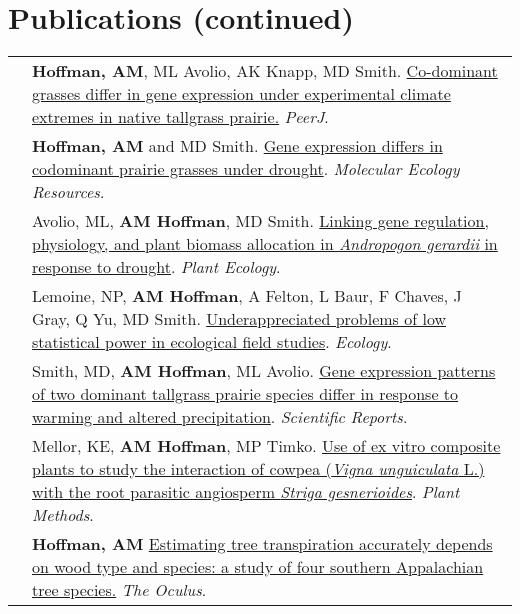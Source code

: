 \documentclass[letterpaper]{deedy-resume} %
\begin{document}
\section{Publications (continued)}
\begin{tabular}{>{\raggedleft\arraybackslash}p{2cm}p{16cm}}

2018 & \textbf{Hoffman, AM}, ML Avolio, AK Knapp, MD Smith. \href{https://peerj.com/articles/4394.pdf}{Co-dominant grasses differ in gene expression under experimental climate extremes in native tallgrass prairie.} \textcolor{special}{\textit{PeerJ}}.\\

2017 & \textbf{Hoffman, AM} and MD Smith. \href{http://onlinelibrary.wiley.com/doi/10.1111/1755-0998.12733/full}{Gene expression differs in codominant prairie grasses under drought}. \textcolor{special}{\textit{Molecular Ecology Resources}}.\\

2017 & Avolio, ML, \textbf{AM Hoffman}, MD Smith. \href{https://link.springer.com/article/10.1007/s11258-017-0773-3}{Linking gene regulation, physiology, and plant biomass allocation in \textit{Andropogon gerardii} in response to drought}. \textcolor{special}{\textit{Plant Ecology}}. \\

2016 & Lemoine, NP, \textbf{AM Hoffman}, A Felton, L Baur, F Chaves, J Gray, Q Yu, MD Smith. \href{http://onlinelibrary.wiley.com/doi/10.1002/ecy.1506/full}{Underappreciated problems of low statistical power in ecological field studies}. \textcolor{special}{\textit{Ecology}}. \\

2016 & Smith, MD, \textbf{AM Hoffman}, ML Avolio. \href{http://www.nature.com/articles/srep25522}{Gene expression patterns of two dominant tallgrass prairie species differ in response to warming and altered precipitation}. \textcolor{special}{\textit{Scientific Reports}}.\\

2012 & Mellor, KE, \textbf{AM Hoffman}, MP Timko. \href{http://www.plantmethods.com/content/pdf/1746-4811-8-22.pdf}{Use of ex vitro composite plants to study the interaction of cowpea (\textit{Vigna unguiculata} L.) with the root parasitic angiosperm \textit{Striga gesnerioides}}. \textcolor{special}{\textit{Plant Methods}}. \\

2012 & \textbf{Hoffman, AM} \href{http://issuu.com/theoculus/docs/spring2012/}{Estimating tree transpiration accurately depends on wood type and species: a study of four southern Appalachian tree species.} \textcolor{special}{\textit{The Oculus}}.\\


\end{tabular}
\end{document}
